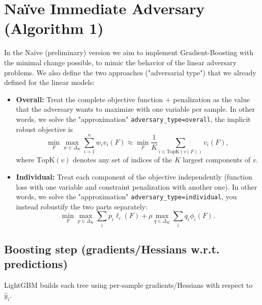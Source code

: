 \documentclass[11pt]{article}
\newcommand{\yh}{\hat y}
\theoremstyle{plain}
\theoremstyle{definition}
\newcommand{\1}{\mathbf{1}}
\begin{document}
\section{Naïve Immediate Adversary (Algorithm 1)}

In the Naïve (preliminary) version we aim to implement Gradient-Boosting with the minimal change possible, to mimic the behavior of the linear adversary problems. We also define the two approaches ("adversarial type") that we already defined for the linear models: 

\begin{itemize}
    \item 
\textbf{Overall:} Treat the complete objective function + penalization as the value that the adversary wants to maximize with one variable per sample. In other words, we solve the "approximation"
\texttt{adversary\_type=overall}, the implicit robust objective is
\begin{equation}
\min_F \max_{w\in\Delta_K} \sum_{i=1}^n w_i v_i(F)
\approx \min_F \frac{1}{K}\sum_{i\in \mathrm{TopK}(v(F))} v_i(F),
\label{eq:hardOverall}
\end{equation}
where $\mathrm{TopK}(v)$ denotes any set of indices of the $K$ largest components of $v$.

\item \textbf{Individual:} Treat each component of the objective independently (function loss with one variable and constraint penalization with another one). In other words, we solve the "approximation"
\texttt{adversary\_type=individual}, you instead robustify the two parts separately:
\begin{equation}
\min_F \max_{p\in\Delta_K} \sum_i p_i \ell_i(F)
+ \rho \max_{q\in\Delta_K} \sum_i q_i \phi_i(F).
\label{eq:hardIndividual}
\end{equation}

\end{itemize}



\subsection{Boosting step (gradients/Hessians w.r.t. predictions)}
LightGBM builds each tree using per-sample gradients/Hessians with respect to $\yh_i$.
\end{document}
